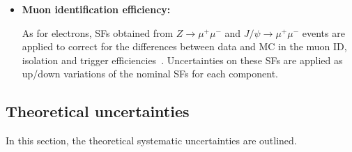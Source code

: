 \begin{itemize}
\item \textbf{Muon identification efficiency:}

As for electrons, SFs obtained from $Z\rightarrow \mu^{+}\mu^{-}$ and $J/\psi \rightarrow \mu^{+}\mu^{-}$ events are applied to correct for the differences between data and MC in the muon ID,
isolation and trigger efficiencies~\cite{MUON-2018-03}. Uncertainties on these SFs are applied as up/down variations of the nominal SFs for each component.


\end{itemize}

\subsection{Theoretical uncertainties}
\label{subsec:syst_theory}

In this section, the theoretical systematic uncertainties are outlined.

